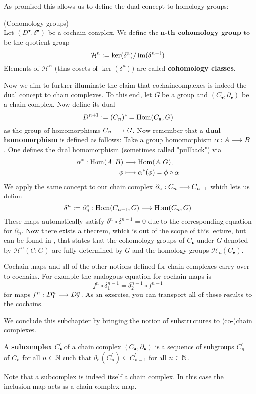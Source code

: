 As promised this allows us to define the dual concept to homology groups:

\begin{definition}
\label{def:Cohomology}
(Cohomology groups)\\
Let $(D^\bullet, \delta^\bullet)$ be a cochain complex. We define the \textbf{n-th cohomology group} to be the quotient group
$$ \mathcal{H}^n := \ker(\delta^n) / \operatorname{im}(\delta^{n-1}) $$
Elements of $\mathcal{H}^n$ (thus cosets of $\ker(\delta^n)$) are called \textbf{cohomology classes}.
\end{definition}

Now we aim to further illuminate the claim that cochaincomplexes is indeed the dual concept to chain complexes. To this end, let $G$ be a group and $(C_\bullet, \partial_\bullet)$ be a chain complex. Now define its dual
$$ D^{n+1} := (C_n)^* = \operatorname{Hom}(C_n, G) $$
as the group of homomorphisms $C_n \longrightarrow G$. Now remember that a \textbf{dual homomorphism} is defined as follows: Take a group homomorphism $\alpha: A \longrightarrow B$. One defines the dual homomorphism (sometimes called "pullback") via
\begin{align*}
  \alpha^*: \Hom(A,B) &\lra \Hom(A,G),\\
  \phi &\lmap \alpha^*(\phi) = \phi \circ \alpha
\end{align*}
We apply the same concept to our chain complex $\partial_n:C_n \longrightarrow C_{n-1}$ which lets us define
$$\delta^n := \partial_n^* : \operatorname{Hom}(C_{n-1}, G) \longrightarrow \operatorname{Hom}(C_n, G)$$
These maps automatically satisfy $\delta^n \circ \delta^{n-1} = 0$ due to the corresponding equation for $\partial_n$. Now there exists a theorem, which is out of the scope of this lecture, but can be found in , that states that the cohomology groups of $C_\bullet$ under $G$ denoted by $\mathcal{H}^n(C;G)$ are fully determined by $G$ and the homology groups $\mathcal{H}_n(C_\bullet)$.

\begin{rem}
  Cochain maps and all of the other notions defined for chain complexes carry over to cochains. For example the analogous equation for cochain maps is
  $$ f^n \circ \delta_1^{n-1} = \delta_2^{n-1} \circ f^{n-1} $$
  for maps $f^n: D_1^n \longrightarrow D^n_2$. As an exercise, you can transport all of these results to the cochains.
\end{rem}

We conclude this subchapter by bringing the notion of substructures to (co-)chain complexes.

\begin{definition}
  A \textbf{subcomplex} $C_\bullet^\prime$ of a chain complex $(C_\bullet, \partial_\bullet)$ is a sequence of subgroups $C_n^\prime$ of $C_n$ for all $n\in \mathbb{N}$ such that $\partial_n(C^\prime_n) \subseteq C_{n-1}^\prime$ for all $n\in \mathbb{N}$.
\end{definition}

\begin{rem}
  Note that a subcomplex is indeed itself a chain complex. In this case the inclusion map acts as a chain complex map.
\end{rem}



\newpage
